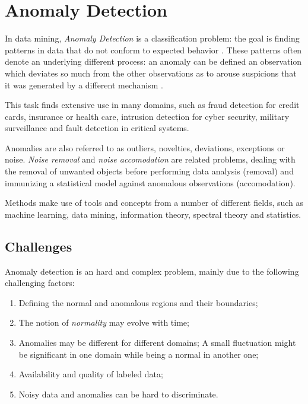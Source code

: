 \section{Anomaly Detection}

In data mining, \textit{Anomaly Detection} is a classification problem: the goal is finding patterns in data that do not conform to expected behavior \cite{chandola2009anomaly}. These patterns often denote an underlying different process: an anomaly can be defined an observation which deviates so much from the other observations as to arouse suspicions that it was generated by a different mechanism \cite{hawkins1980identification}.

This task finds extensive use in many domains, such as fraud detection for credit cards, insurance or health care, intrusion detection for cyber security, military surveillance and fault detection in critical systems.

Anomalies are also referred to as outliers, novelties, deviations, exceptions or noise. \textit{Noise removal} and \textit{noise accomodation} are related problems, dealing with the removal of unwanted objects before performing data analysis (removal) and immunizing a statistical model against anomalous observations (accomodation).

Methods make use of tools and concepts from a number of different fields, such as machine learning, data mining, information theory, spectral theory and statistics.

\subsection{Challenges}

Anomaly detection is an hard and complex problem, mainly due to the following challenging factors:

\begin{enumerate}
	\item Defining the normal and anomalous regions and their boundaries;
	\item The notion of \textit{normality} may evolve with time;
	\item Anomalies may be different for different domains; A small fluctuation might be significant in one domain while being a normal in another one;
	\item Availability and quality of labeled data;
	\item Noisy data and anomalies can be hard to discriminate.
\end{enumerate}

